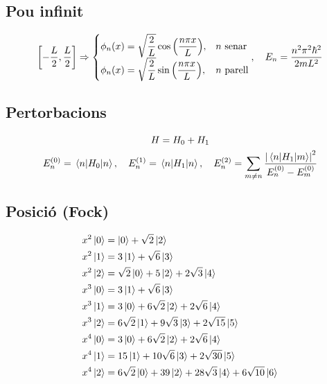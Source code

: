 \subsection{Pou infinit}
\begin{align*}
	\qty[-\dfrac{L}{2}, \dfrac{L}{2}] \Rightarrow
	\begin{cases}
		\phi_{n}(x) = \sqrt{\dfrac{2}{L}} \cos \qty(\dfrac{n\pi x}{L}), & n \text{ senar} \\
		\phi_{n}(x) = \sqrt{\dfrac{2}{L}} \sin \qty(\dfrac{n\pi x}{L}), & n \text{ parell}
	\end{cases}
	\qc E_{n} = \dfrac{n^{2} \pi^{2} \hbar^{2}}{2m L^{2}}
\end{align*}

\subsection{Pertorbacions}
\begin{align*}
\begin{gathered}
	H = H_{0} + H_{1} \\
	E_{n}^{(0)} = \mel{n}{H_{0}}{n} \qc E_{n}^{(1)} = \mel{n}{H_{1}}{n} \qc E_{n}^{(2)} = \sum_{m \neq n} \frac{\abs{\mel{n}{H_{1}}{m}}^{2} }{E_{n}^{(0)} - E_{m}^{(0)}}
\end{gathered}
\end{align*}

\subsection{Posició (Fock)}
\begin{align*}
\begin{aligned}
	x^{2}\ket{0} & = \ket{0} + \sqrt{2} \ket{2} \\
	x^{2}\ket{1} & = 3 \ket{1} + \sqrt{6} \ket{3} \\
	x^{2}\ket{2} & = \sqrt{2} \ket{0} + 5 \ket{2} + 2 \sqrt{3} \ket{4} \\
	x^{3}\ket{0} & = 3 \ket{1} + \sqrt{6} \ket{3} \\
	x^{3}\ket{1} & = 3 \ket{0} + 6 \sqrt{2} \ket{2} + 2 \sqrt{6} \ket{4} \\
	x^{3}\ket{2} & = 6 \sqrt{2} \ket{1} + 9 \sqrt{3} \ket{3} + 2 \sqrt{15} \ket{5} \\
	x^{4}\ket{0} & = 3 \ket{0} + 6 \sqrt{2} \ket{2} + 2 \sqrt{6} \ket{4} \\
	x^{4}\ket{1} & = 15 \ket{1} + 10 \sqrt{6} \ket{3} + 2 \sqrt{30} \ket{5} \\
	x^{4}\ket{2} & = 6 \sqrt{2} \ket{0} + 39 \ket{2} + 28 \sqrt{3} \ket{4} + 6 \sqrt{10} \ket{6} \\
\end{aligned}
\end{align*}

